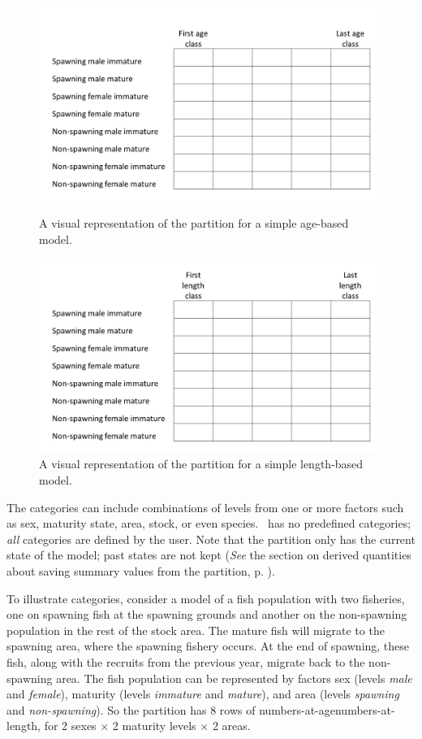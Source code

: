 \begin{figure}[H]
	\centering
	\ifAgeBased
	\includegraphics[scale=0.4]{Figures/partition2-age.png}
	\caption{A visual representation of the partition for a simple age-based model.}
	\else
	\includegraphics[scale=0.4]{Figures/partition2-length.png}
	\caption{A visual representation of the partition for a simple length-based model.}
	\fi
    \label{Fig:part}
\end{figure}

The categories can include combinations of levels from one or more factors such as sex, maturity state, area, stock, or even species. \CNAME\ has no predefined categories; \emph{all} categories are defined by the user. Note that the partition only has the current state of the model; past states are not kept (\textit{See} the section on derived quantities about saving summary values from the partition, p. \pageref{sec:DerivedQuantity}).

To illustrate categories, consider a model of a fish population with two fisheries, one on spawning fish at the spawning grounds and another on the non-spawning population in the rest of the stock area. The mature fish will migrate to the spawning area, where the spawning fishery occurs. At the end of spawning, these fish, along with the recruits from the previous year, migrate back to the non-spawning area. The fish population can be represented  by factors sex (levels \textit{male} and \textit{female}), maturity (levels \textit{immature} and \textit{mature}), and area (levels \textit{spawning} and \textit{non-spawning}). So the partition has 8 rows of \ifAgeBased numbers-at-age\else numbers-at-length\fi, for 2 sexes $\times$ 2 maturity levels $\times$ 2 areas.

